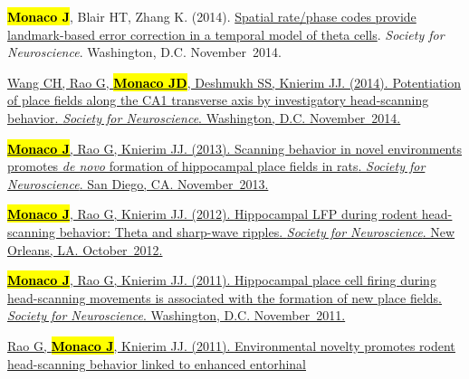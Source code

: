 \documentclass[10pt]{article}
\newcommand{\itemtitle}[1]{{\color{hopkinsblue}\ul{#1}}}
\newcommand{\joehl}[1]{\hl{\textbf{#1}}}
\begin{document}
\begin{description}
    {\joehl{Monaco J}, Blair HT, Zhang K. (2014). \itemtitle{Spatial rate/phase
        codes provide landmark-based error correction in a temporal model of theta
      cells}. \emph{Society for Neuroscience}. Washington, D.C.  November~2014.}
  \item[\quad]
    \href{http://www.abstractsonline.com/Plan/ViewAbstract.aspx?sKey=bfb59866-8deb-44a6-9515-a7aab630507b&cKey=d201b3aa-7725-452e-b0dd-c41d204b5b54&mKey=54c85d94-6d69-4b09-afaa-502c0e680ca7}
    {Wang CH, Rao G, \joehl{Monaco JD}, Deshmukh SS, Knierim JJ. (2014).
    \itemtitle{Potentiation of place fields along the CA1 transverse axis by
      investigatory head-scanning behavior}. \emph{Society for Neuroscience}. 
    Washington, D.C. November~2014.}
  \item[\quad]
    \href{http://www.abstractsonline.com/Plan/ViewAbstract.aspx?sKey=32eccac1-4e1d-4e81-bf5c-f39bcb605757&cKey=4710dece-cc8e-4b48-8764-49ea174b91ef&mKey=8d2a5bec-4825-4cd6-9439-b42bb151d1cf}
    {\joehl{Monaco J}, Rao G, Knierim JJ. (2013). \itemtitle{Scanning behavior
        in novel environments promotes \emph{de novo} formation of hippocampal place
      fields in rats}. \emph{Society for Neuroscience}. San Diego, CA. November~2013.}
  \item[\quad]
    \href{http://www.abstractsonline.com/Plan/ViewAbstract.aspx?sKey=f5b9fa94-7d15-48c7-9d67-b89cd2883025&cKey=a53349ca-41b1-4664-b022-85d0d1fe59b8&mKey=70007181-01C9-4DE9-A0A2-EEBFA14CD9F1}
    {\joehl{Monaco J}, Rao G, Knierim JJ. (2012). \itemtitle{Hippocampal LFP
      during rodent head-scanning behavior: Theta and sharp-wave ripples}.
      \emph{Society for Neuroscience}. New Orleans, LA. October~2012.}
  \item[\quad]
    \href{http://www.abstractsonline.com/Plan/ViewAbstract.aspx?sKey=c48e9f5f-1274-4486-85bf-38ee591629e1&cKey=190bd951-c183-428d-a4c5-01eb61556d79&mKey=8334BE29-8911-4991-8C31-32B32DD5E6C8}
    {\joehl{Monaco J}, Rao G, Knierim JJ. (2011). \itemtitle{Hippocampal place
        cell firing during head-scanning movements is associated with the formation
      of new place fields}. \emph{Society for Neuroscience}. Washington, D.C. November~2011.}
  \item[\quad]
    \href{http://www.abstractsonline.com/Plan/ViewAbstract.aspx?sKey=c48e9f5f-1274-4486-85bf-38ee591629e1&cKey=3ec26e6f-8c59-4be2-bad3-e1572d75e07e&mKey=8334BE29-8911-4991-8C31-32B32DD5E6C8}
    {Rao G, \joehl{Monaco J}, Knierim JJ. (2011). \itemtitle{Environmental
        novelty promotes rodent head-scanning behavior linked to enhanced entorhinal
}}
\end{description}
\end{document}
